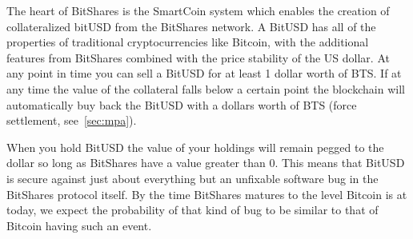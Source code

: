 The heart of BitShares is the SmartCoin system which enables the creation of
collateralized bitUSD from the BitShares network. A BitUSD has all of the
properties of traditional cryptocurrencies like Bitcoin, with the additional
features from BitShares combined with the price stability of the US dollar. At
any point in time you can sell a BitUSD for at least 1 dollar worth of BTS. If
at any time the value of the collateral falls below a certain point the
blockchain will automatically buy back the BitUSD with a dollars worth of BTS
(force settlement, see~\cref{sec:mpa}).

When you hold BitUSD the value of your holdings will remain pegged to the
dollar so long as BitShares have a value greater than $0$. This means that
BitUSD is secure against just about everything but an unfixable software bug in
the BitShares protocol itself. By the time BitShares matures to the level
Bitcoin is at today, we expect the probability of that kind of bug to be
similar to that of Bitcoin having such an event.
